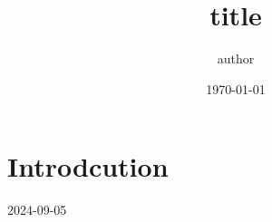 \documentclass{article}
\title{title}
\author{author}
\date{\today}
\begin{document}
\maketitle
\pagebreak
\tableofcontents
\pagebreak

\section{Introdcution}
\begin{center}
	\begin{tikzfigure}2024-09-05\end{tikzfigure}
\end{center}
\end{document}
